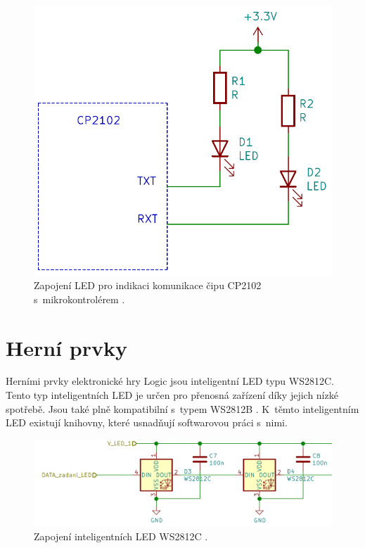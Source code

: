   \begin{figure}[!h]
      \begin{center}
        \includegraphics[scale=0.5]{obrazky/CP2102_LED.png}
      \end{center}
      \caption[Zapojení LED pro indikaci komunikace čipu CP2102 s~mikrokontrolérem \cite{CP2102_datasheet}]{Zapojení LED pro indikaci 
      komunikace čipu CP2102 s~mikrokontrolérem \cite{CP2102_datasheet}.}
  \end{figure}

  \section{Herní prvky}
  Herními prvky elektronické hry Logic jsou inteligentní LED typu WS2812C. Tento typ inteligentních LED je určen pro přenosná 
  zařízení díky jejich nízké spotřebě. Jsou také plně kompatibilní s~typem WS2812B \cite{WS2812C_datasheet}. K~těmto inteligentním LED 
  existují knihovny, které usnadňují softwarovou práci s~nimi.

  \begin{figure}[!h]
    \begin{center}
      \includegraphics[scale=0.5]{obrazky/2_LED_WS2812C.png}
    \end{center}
    \caption[Zapojení inteligentních LED WS2812C \cite{WS2812C_datasheet}]{Zapojení inteligentních LED WS2812C \cite{WS2812C_datasheet}.}
  \end{figure}

